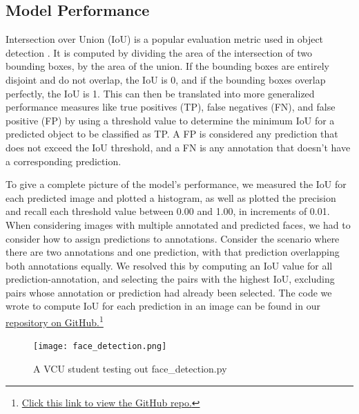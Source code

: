 \documentclass[conference]{IEEEtran}
\begin{document}
\subsection{Model Performance}
Intersection over Union (IoU) is a popular evaluation metric used in object detection \cite{IOURezatofighi}. It is computed by dividing the area of the intersection of two bounding boxes, by the area of the union. If the bounding boxes are entirely disjoint and do not overlap, the IoU is 0, and if the bounding boxes overlap perfectly, the IoU is 1. This can then be translated into more generalized performance measures like true positives (TP), false negatives (FN), and false positive (FP) by using a threshold value to determine the minimum IoU for a predicted object to be classified as TP. A FP is considered any prediction that does not exceed the IoU threshold, and a FN is any annotation that doesn't have a corresponding prediction. 

To give a complete picture of the model's performance, we measured the IoU for each predicted image and plotted a histogram, as well as plotted the precision and recall each threshold value between 0.00 and 1.00, in increments of 0.01. When considering images with multiple annotated and predicted faces, we had to consider how to assign predictions to annotations. Consider the scenario where there are two annotations and one prediction, with that prediction overlapping both annotations equally. We resolved this by computing an IoU value for all prediction-annotation, and selecting the pairs with the highest IoU, excluding pairs whose annotation or prediction had already been selected. The code we wrote to compute IoU for each prediction in an image can be found in our \href{https://github.com/etleyden/rpi-face-detection-research-project/blob/main/src/test_model.py}{repository on GitHub.}\footnote{\href{https://github.com/etleyden/rpi-face-detection-research-project}{Click this link to view the GitHub repo.}}

\begin{figure}[htbp]
\centerline{\texttt{[image: face\_detection.png]}}
\caption{A VCU student testing out face\_detection.py}
\label{face_detection_example}
\end{figure}
\end{document}
